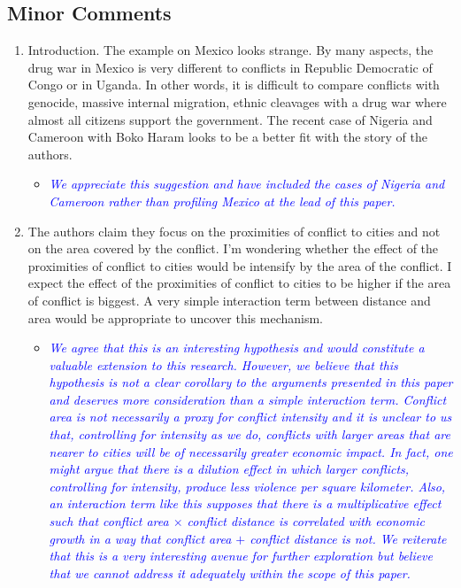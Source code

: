 \subsection{Minor Comments}

\begin{enumerate}

\item Introduction. The example on Mexico looks strange. By many aspects, the drug war in Mexico is very different to conflicts in Republic Democratic of Congo or in Uganda. In other words, it is difficult to compare conflicts with genocide, massive internal migration, ethnic cleavages with a drug war where almost all citizens support the government. The recent case of Nigeria and Cameroon with Boko Haram looks to be a better fit with the story of the authors.

\begin{itemize}
\item \textcolor{blue}{\emph{
	We appreciate this suggestion and have included the cases of Nigeria and Cameroon rather than profiling Mexico at the lead of this paper. 
}}
\end{itemize}

\item The authors claim they focus on the proximities of conflict to cities and not on the area covered by the conflict. I’m wondering whether the effect of the proximities of conflict to cities would be intensify by the area of the conflict. I expect the effect of the proximities of conflict to cities to be higher if the area of conflict is biggest. A very simple interaction term between distance and area would be appropriate to uncover this mechanism.

\begin{itemize}
\item \textcolor{blue}{\emph{
	We agree that this is an interesting hypothesis and would constitute a valuable extension to this research. However, we believe that this hypothesis is not a clear corollary to the arguments presented in this paper and deserves more consideration than a simple interaction term. Conflict area is not necessarily a proxy for conflict intensity and it is unclear to us that, controlling for intensity as we do, conflicts with larger areas that are nearer to cities will be of necessarily greater economic impact. In fact, one might argue that there is a dilution effect in which larger conflicts, controlling for intensity, produce less violence per square kilometer. Also, an interaction term like this supposes that there is a multiplicative effect such that \textnormal{conflict area} $\times$ \textnormal{conflict distance} is correlated with economic growth in a way that \textnormal{conflict area} $+$ \textnormal{conflict distance} is not. We reiterate that this is a very interesting avenue for further exploration but believe that we cannot address it adequately within the scope of this paper.
}}
\end{itemize}


\end{enumerate}
